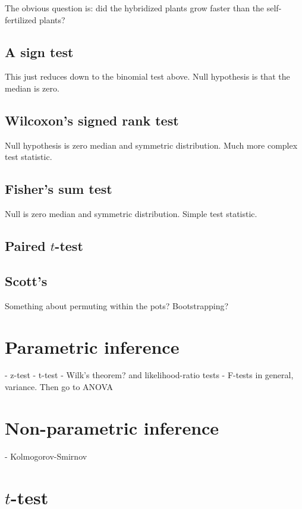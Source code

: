 The obvious question is: did the hybridized plants grow faster than the self-fertilized plants?

\subsection{A sign test}

This just reduces down to the binomial test above. Null hypothesis is that the median is zero.

\subsection{Wilcoxon's signed rank test}

Null hypothesis is zero median and symmetric distribution. Much more complex test statistic.

\subsection{Fisher's sum test}

Null is zero median and symmetric distribution. Simple test statistic.

\subsection{Paired $t$-test}

\subsection{Scott's}

Something about permuting within the pots? Bootstrapping?

\section{Parametric inference}

- z-test
- t-test
- Wilk's theorem? and likelihood-ratio tests
- F-tests in general, variance. Then go to ANOVA

\section{Non-parametric inference}

- Kolmogorov-Smirnov

\section{$t$-test}

